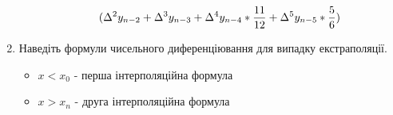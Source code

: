 \begin{enumerate}
\begin{itemize}
\begin{align}
                        ( \Delta \textsuperscript{2} y_{n - 2}
                        + \Delta \textsuperscript{3} y_{n - 3}
                        + \Delta \textsuperscript{4} y_{n - 4} * \frac{11}{12}
                        + \Delta \textsuperscript{5} y_{n - 5} * \frac{5}{6} )
                    \end{align}
          \end{itemize}
    \item Наведіть формули чисельного диференціювання для випадку екстраполяції.
          \begin{itemize}
              \item $x < x_0$ - перша інтерполяційна формула
              \item $x > x_n$ - друга інтерполяційна формула
          \end{itemize}
\end{enumerate}
